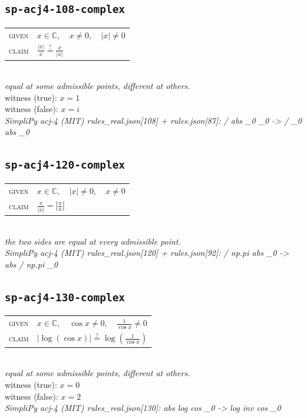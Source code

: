 \documentclass[11pt]{article}
\begin{document}
\subsection*{\texttt{sp-acj4-108-complex}}
\begin{tabular}{@{}l@{\quad}l@{}}
\textsc{given} & $x \in \mathbb{C},\quad x \neq 0,\quad \left|x\right| \neq 0$ \\[4pt]
\textsc{claim} & $\displaystyle \frac{\left|x\right|}{x} \overset{?}{=} \frac{x}{\left|x\right|}$ \\
\end{tabular}\\[2pt]
{\small\emph{equal at some admissible points, different at others.}}\\
{\footnotesize\color{gray}witness (true): $x = 1$}\\
{\footnotesize\color{gray}witness (false): $x = i$}\\
\emph{SimpliPy acj-4 (MIT) rules\_real.json[108] + rules.json[87]: / abs \_0 \_0  ->  / \_0 abs \_0}\\

\subsection*{\texttt{sp-acj4-120-complex}}
\begin{tabular}{@{}l@{\quad}l@{}}
\textsc{given} & $x \in \mathbb{C},\quad \left|x\right| \neq 0,\quad x \neq 0$ \\[4pt]
\textsc{claim} & $\displaystyle \frac{\pi}{\left|x\right|} = \left|\frac{\pi}{x}\right|$ \\
\end{tabular}\\[2pt]
{\small\emph{the two sides are equal at every admissible point.}}\\
\emph{SimpliPy acj-4 (MIT) rules\_real.json[120] + rules.json[92]: / np.pi abs \_0  ->  abs / np.pi \_0}\\

\subsection*{\texttt{sp-acj4-130-complex}}
\begin{tabular}{@{}l@{\quad}l@{}}
\textsc{given} & $x \in \mathbb{C},\quad \cos x \neq 0,\quad \frac{1}{\cos x} \neq 0$ \\[4pt]
\textsc{claim} & $\displaystyle \left|\log\left(\cos x\right)\right| \overset{?}{=} \log\left(\frac{1}{\cos x}\right)$ \\
\end{tabular}\\[2pt]
{\small\emph{equal at some admissible points, different at others.}}\\
{\footnotesize\color{gray}witness (true): $x = 0$}\\
{\footnotesize\color{gray}witness (false): $x = 2$}\\
\emph{SimpliPy acj-4 (MIT) rules\_real.json[130]: abs log cos \_0  ->  log inv cos \_0}\\
\end{document}
